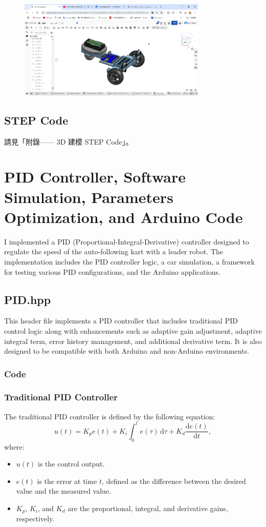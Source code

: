 \documentclass[a4paper,12pt]{article}
\begin{document}
\begin{center}\begin{figure}[H]\centering\includegraphics[width=0.8\textwidth]{./model_images/c4.png}\end{figure}\FloatBarrier\end{center}
\subsection{STEP Code}
請見「附錄—— 3D 建模 STEP Code」。

\section{PID Controller, Software Simulation, Parameters Optimization, and Arduino Code}
I implemented a PID (Proportional-Integral-Derivative) controller designed to regulate the speed of the auto-following kart with a leader robot. The implementation includes the PID controller logic, a car simulation, a framework for testing various PID configurations, and the Arduino applications.
\subsection{PID.hpp}
This header file implements a PID controller that includes traditional PID control logic along with enhancements such as adaptive gain adjustment, adaptive integral term, error history management, and additional derivative term. It is also designed to be compatible with both Arduino and non-Arduino environments.
\subsubsection{Code}

\subsubsection{Traditional PID Controller}
The traditional PID controller is defined by the following equation:
$$
u(t) = K_p e(t) + K_i \int_0^t e(\tau) \,\mathrm{d}\tau + K_d \frac{\mathrm{d}e(t)}{\mathrm{d}t},
$$
where:
\begin{itemize}
\item $u(t)$ is the control output.
\item $e(t)$ is the error at time $t$, defined as the difference between the desired value and the measured value.
\item $K_p$, $K_i$, and $K_d$ are the proportional, integral, and derivative gains, respectively.
\end{itemize}
\end{document}
